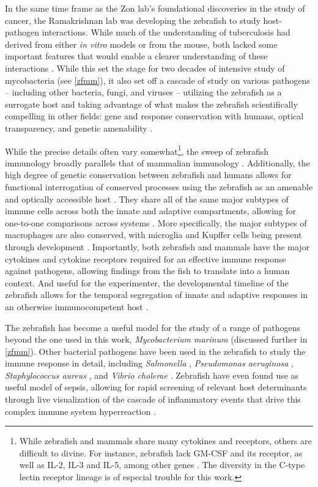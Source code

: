 In the same time frame as the Zon lab's foundational discoveries in the study of cancer, the Ramakrishnan lab was developing the zebrafish to study host-pathogen interactions. While much of the understanding of tuberculosis had derived from either \textit{in vitro} models or from the mouse, both lacked some important features that would enable a clearer understanding of these interactions \citep{Davis2002}. While this set the stage for two decades of intensive study of mycobacteria (see \autoref{zfmm}), it also set off a cascade of study on various pathogens -- including other bacteria, fungi, and viruses -- utilizing the zebrafish as a surrogate host and taking advantage of what makes the zebrafish scientifically compelling in other fields: gene and response conservation with humans, optical transparency, and genetic amenability \citep{Kanther2010, Angosto2014, Levraud2014}.

While the precise details often vary somewhat\footnote{While zebrafish and mammals share many cytokines and receptors, others are difficult to divine. For instance, zebrafish lack GM-CSF and its receptor, as well as IL-2, IL-3 and IL-5, among other genes \citep{Pazhakh2018, Lawir2019, Stachura2013}. The diversity in the C-type lectin receptor lineage is of especial trouble for this work.}, the sweep of zebrafish immunology broadly parallels that of mammalian immunology \citep{Zou2016, Renshaw2012}. Additionally, the high degree of genetic conservation between zebrafish and humans allows for functional interrogation of conserved processes using the zebrafish as an amenable and optically accessible host \citep{Gomes2020}. They share all of the same major subtypes of immune cells across both the innate and adaptive compartments, allowing for one-to-one comparisons across systems \citep{vanderSar2004, Thisse2002}. More specifically, the major subtypes of macrophages are also conserved, with microglia and Kupffer cells being present through development \citep{Oosterhof2015, Shwartz2019}. Importantly, both zebrafish and mammals have the major cytokines and cytokine receptors required for an effective immune response against pathogens, allowing findings from the fish to translate into a human context. And useful for the experimenter, the developmental timeline of the zebrafish allows for the temporal segregation of innate and adaptive responses in an otherwise immunocompetent host \citep{Sullivan2017, Masud2017}.

The zebrafish has become a useful model for the study of a range of pathogens beyond the one used in this work, \textit{Mycobacterium marinum} \citep{Benard2012, Brannon2009, Briolat2014} (discussed further in \autoref{zfmm}). Other bacterial pathogens have been used in the zebrafish to study the immune response in detail, including \textit{Salmonella} \citep{vanderSar2003}, \textit{Pseudomonas aeruginosa} \citep{Pont2021}, \textit{Staphylococcus aureus} \citep{Prajsnar2008}, and \textit{Vibrio cholerae} \citep{Runft2014}. Zebrafish have even found use as useful model of sepsis, allowing for rapid screening of relevant host determinants through live visualization of the cascade of inflammatory events that drive this complex immune system hyperreaction \citep{Barber2016, Philip2017, Ruyra2014}.

